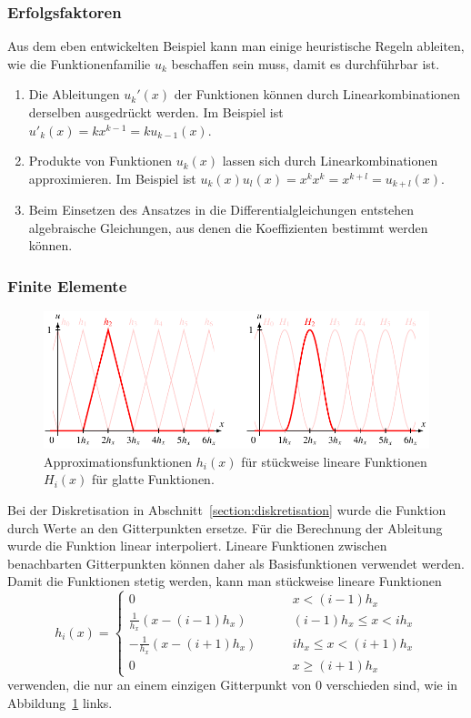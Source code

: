 \subsubsection{Erfolgsfaktoren}
Aus dem eben entwickelten Beispiel kann man einige heuristische Regeln ableiten,
wie die Funktionenfamilie $u_k$ beschaffen sein muss, damit es
durchführbar ist.
\begin{enumerate}
\item Die Ableitungen $u_k'(x)$ der Funktionen können durch
Linearkombinationen derselben ausgedrückt werden.
Im Beispiel ist $u'_k(x)=kx^{k-1}=ku_{k-1}(x)$.
\item Produkte von Funktionen $u_k(x)$ lassen sich durch Linearkombinationen
approximieren.
Im Beispiel ist $u_k(x)u_l(x)=x^kx^k = x^{k+l}=u_{k+l}(x)$.
\item Beim Einsetzen des Ansatzes in die Differentialgleichungen
entstehen algebraische Gleichungen, aus denen die Koeffizienten
bestimmt werden können.
\end{enumerate}

\subsubsection{Finite Elemente}
\begin{figure}
\centering
\includegraphics[width=\hsize]{chapters/2/fe.pdf}
\caption{Approximationsfunktionen $h_i(x)$ für stückweise lineare Funktionen 
$H_i(x)$ für glatte Funktionen.
\label{skript:finiteelemente}}
\end{figure}
Bei der Diskretisation in Abschnitt~\ref{section:diskretisation} wurde die
Funktion durch Werte an den Gitterpunkten ersetze.
Für die Berechnung der Ableitung wurde die Funktion linear interpoliert.
Lineare Funktionen zwischen benachbarten Gitterpunkten können daher als
Basisfunktionen verwendet werden.
Damit die Funktionen stetig werden, kann man stückweise lineare
Funktionen
\[
h_i(x) =
\begin{cases}
0&\qquad x< (i-1)h_x\\
\frac{1}{h_x}(x-(i-1)h_x)&\qquad (i-1)h_x \le x < ih_x\\
-\frac{1}{h_x}(x-(i+1)h_x)&\qquad ih_x \le x < (i+1)h_x\\
0&\qquad x \ge (i+1)h_x
\end{cases}
\]
verwenden, die nur an einem einzigen Gitterpunkt von $0$
verschieden sind, wie in Abbildung~\ref{skript:finiteelemente} links.

